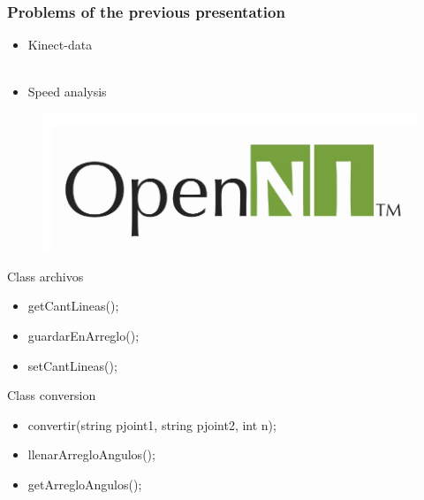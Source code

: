 \documentclass{beamer}
\begin{document}
\begin{frame}
\frametitle{Problems of the previous presentation}
\begin{itemize}
\item Kinect-data\\~\\
\item Speed analysis
\end{itemize}

\end{frame}
\begin{frame}

\begin{figure}
\includegraphics[width=0.6\linewidth]{openni.jpg}
\end{figure}

\end{frame}


\begin{frame}

Class archivos
 
\begin{itemize}
\item getCantLineas();
\item guardarEnArreglo();
\item setCantLineas();
\end{itemize}

\end{frame}


\begin{frame}

Class conversion
 
\begin{itemize}
\item convertir(string pjoint1, string pjoint2, int n);
\item llenarArregloAngulos();
\item getArregloAngulos();
\end{itemize}



\end{frame}
\end{document}
